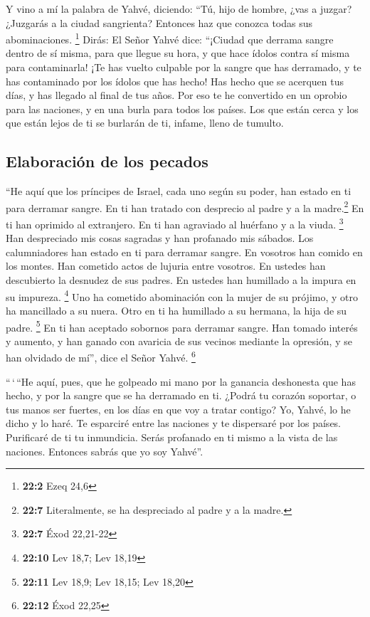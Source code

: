\begin{paracol}{2}
 Y vino a mí la palabra de Yahvé, diciendo: 
``Tú, hijo de hombre, ¿vas a juzgar? ¿Juzgarás a la ciudad sangrienta?
Entonces haz que conozca todas sus abominaciones. \footnote{\textbf{22:2}
  Ezeq 24,6}  Dirás: El Señor Yahvé dice: ``¡Ciudad que
derrama sangre dentro de sí misma, para que llegue su hora, y que hace
ídolos contra sí misma para contaminarla!  ¡Te has vuelto
culpable por la sangre que has derramado, y te has contaminado por los
ídolos que has hecho! Has hecho que se acerquen tus días, y has llegado
al final de tus años. Por eso te he convertido en un oprobio para las
naciones, y en una burla para todos los países.  Los que
están cerca y los que están lejos de ti se burlarán de ti, infame, lleno
de tumulto.

\hypertarget{elaboraciuxf3n-de-los-pecados}{%
\subsection{Elaboración de los
pecados}\label{elaboraciuxf3n-de-los-pecados}}

 ``He aquí que los príncipes de Israel, cada uno según su
poder, han estado en ti para derramar sangre.  En ti han
tratado con desprecio al padre y a la madre.\footnote{\textbf{22:7}
  Literalmente, se ha despreciado al padre y a la madre.} En ti han
oprimido al extranjero. En ti han agraviado al huérfano y a la viuda.
\footnote{\textbf{22:7} Éxod 22,21-22}  Han despreciado
mis cosas sagradas y han profanado mis sábados.  Los
calumniadores han estado en ti para derramar sangre. En vosotros han
comido en los montes. Han cometido actos de lujuria entre vosotros.
 En ustedes han descubierto la desnudez de sus padres. En
ustedes han humillado a la impura en su impureza. \footnote{\textbf{22:10}
  Lev 18,7; Lev 18,19}  Uno ha cometido abominación con
la mujer de su prójimo, y otro ha mancillado a su nuera. Otro en ti ha
humillado a su hermana, la hija de su padre. \footnote{\textbf{22:11}
  Lev 18,9; Lev 18,15; Lev 18,20}  En ti han aceptado
sobornos para derramar sangre. Han tomado interés y aumento, y han
ganado con avaricia de sus vecinos mediante la opresión, y se han
olvidado de mí'', dice el Señor Yahvé. \footnote{\textbf{22:12} Éxod
  22,25}

 ``\,`\,``He aquí, pues, que he golpeado mi mano por la
ganancia deshonesta que has hecho, y por la sangre que se ha derramado
en ti.  ¿Podrá tu corazón soportar, o tus manos ser
fuertes, en los días en que voy a tratar contigo? Yo, Yahvé, lo he dicho
y lo haré.  Te esparciré entre las naciones y te
dispersaré por los países. Purificaré de ti tu inmundicia.
 Serás profanado en ti mismo a la vista de las naciones.
Entonces sabrás que yo soy Yahvé''.


\end{paracol}
